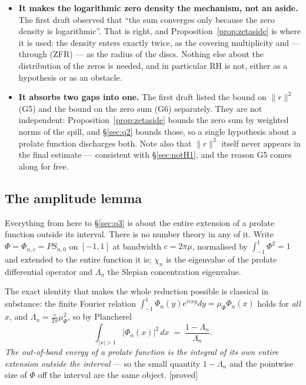\documentclass[11pt,a4paper]{article}
\theoremstyle{plain}
\theoremstyle{definition}
\theoremstyle{remark}
\newcommand{\st}[1]{{\normalfont\sffamily\footnotesize[#1]}}
\newcommand{\proved}{\st{proved}}
\newcommand{\PS}{\mathit{PS}}
\begin{document}
\begin{itemize}\itemsep2pt
\item \textbf{It makes the logarithmic zero density the mechanism, not an
aside.}  The first draft observed that ``the sum converges only because the zero
density is logarithmic''.  That is right, and Proposition~\ref{prop:zetaside} is
where it is used: the density enters exactly twice, as the covering multiplicity
and --- through (ZFR) --- as the radius of the discs.  Nothing else about the
distribution of the zeros is needed, and in particular RH is not, either as a
hypothesis or as an obstacle.
\item \textbf{It absorbs two gaps into one.}  The first draft listed the bound
on $\|r\|^2$ (G5) and the bound on the zero sum (G6) separately.  They are not
independent: Proposition~\ref{prop:zetaside} bounds the zero sum by weighted
norms of the spill, and \S\ref{sec:q2} bounds those, so a single hypothesis
about a prolate function discharges both.  Note also that $\|r\|^2$ itself never
appears in the final estimate --- consistent with \S\ref{sec:notH1}, and the
reason G5 comes along for free.
\end{itemize}

\subsection{The amplitude lemma}
\label{sec:lemma51}

Everything from here to \S\ref{sec:q3} is about the entire extension of a
prolate function outside its interval.  There is no number theory in any of it.
Write $\Phi=\Phi_{n,c}=\PS_{n,0}$ on $[-1,1]$ at bandwidth $c=2\pi\mu$,
normalised by $\int_{-1}^1\Phi^2=1$ and extended to the entire function it is;
$\chi_n$ is the eigenvalue of the prolate differential operator and $\Lambda_n$
the Slepian concentration eigenvalue.

The exact identity that makes the whole reduction possible is classical in
substance: the finite Fourier relation
$\int_{-1}^1\Phi_n(y)e^{icxy}dy=\mu_\Phi\Phi_n(x)$ holds for \emph{all} $x$, and
$\Lambda_n=\frac{c}{2\pi}\mu_\Phi^2$, so by Plancherel
\begin{equation}\label{eq:outofband}
  \int_{|x|>1}|\Phi_n(x)|^2\,dx\;=\;\frac{1-\Lambda_n}{\Lambda_n}.
\end{equation}
\emph{The out-of-band energy of a prolate function is the integral of its own
entire extension outside the interval} --- so the small quantity $1-\Lambda_n$
and the pointwise size of $\Phi$ off the interval are the same object. \proved
\end{document}

